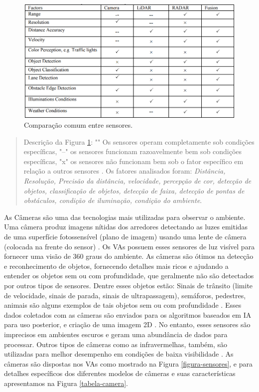 \begin{figure}[H]
\centering
\includegraphics[width=12cm]{Figures/juncao-table.png}
\caption{Comparação comum entre sensores.}
\label{tabela-juncao}
\end{figure}
\begin{quote}
Descrição da Figura \ref{tabela-juncao}: "\checkmark" Os sensores operam completamente sob condições específicas,
"--" os sensores funcionam razoavelmente bem sob condições específicas, "x" os sensores não funcionam bem sob o fator específico em relação a outros sensores \cite{sensors}.
Os fatores analisados foram: \textit{Distância, Resolução, Precisão da distância, velocidade, percepção de cor, detecção de objetos, classificação de objetos, detecção de faixa, detecção de pontas de obstáculos, condição de iluminação, condição do ambiente}.  
\end{quote}

 \label{camera}

As Câmeras são uma das tecnologias mais utilizadas para observar o ambiente. Uma câmera produz imagens nítidas dos arredores detectando as luzes emitidas de uma superfície fotossensível (plano de imagem) usando uma lente de câmera (colocada na frente do sensor) \cite{sensors}. Os VAs possuem esses sensores de luz visível para fornecer uma visão de 360 graus do ambiente. As câmeras são ótimos na detecção e reconhecimento de objetos, fornecendo detalhes mais ricos e ajudando a entender os objetos sem ou com profundidade, que geralmente não são detectados por outros tipos de sensores. Dentre esses objetos estão: Sinais de trânsito (limite de velocidade, sinais de parada, sinais de ultrapassagem), semáforos, pedestres, animais são alguns exemplos de tais objetos sem ou com profundidade \cite{sensors-yet}. Esses dados coletados com as câmeras são enviados para os algoritmos baseados em IA para uso posterior, e criação de uma imagem 2D \cite{aplicacao2}. 
No entanto, esses sensores são imprecisos em ambientes escuros e geram uma abundância de dados para processar. Outros tipos de câmeras como as infravermelhas, também, são utilizadas para melhor desempenho em condições de baixa visibilidade \cite{review-auto}. As câmeras são dispostas nos VAs como mostrado na Figura \ref{figura-sensores}, e para detalhes específicos dos diferentes modelos de câmeras e suas características apresentamos na Figura \ref{tabela-camera}.

